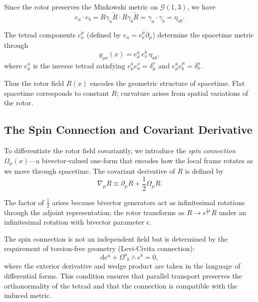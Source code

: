 \documentclass[11pt,a4paper]{article}
\numberwithin{equation}{section}
\theoremstyle{plain}
\theoremstyle{definition}
\theoremstyle{remark}
\newcommand{\dd}{\mathrm{d}}
\begin{document}
Since the rotor preserves the Minkowski metric on $\mathcal{G}(1,3)$, we have
\begin{equation}
e_a \cdot e_b = R\gamma_a\widetilde{R} \cdot R\gamma_b\widetilde{R} = \gamma_a \cdot \gamma_b = \eta_{ab}.
\end{equation}

The tetrad components $e_a^\mu$ (defined by $e_a = e_a^\mu \partial_\mu$) determine the spacetime metric through
\begin{equation}
g_{\mu\nu}(x) = e_\mu^a\, e_\nu^b\, \eta_{ab},
\label{eq:metric-def}
\end{equation}
where $e_\mu^a$ is the inverse tetrad satisfying $e_\mu^a e_a^\nu = \delta_\mu^\nu$ and $e_\mu^a e_b^\mu = \delta_b^a$.

Thus the rotor field $R(x)$ encodes the geometric structure of spacetime. Flat spacetime corresponds to constant $R$; curvature arises from spatial variations of the rotor.

\subsection{The Spin Connection and Covariant Derivative}

To differentiate the rotor field covariantly, we introduce the \emph{spin connection} $\Omega_\mu(x)$---a bivector-valued one-form that encodes how the local frame rotates as we move through spacetime. The covariant derivative of $R$ is defined by
\begin{equation}
\nabla_\mu R \equiv \partial_\mu R + \frac{1}{2}\Omega_\mu R.
\label{eq:covariant-def}
\end{equation}

The factor of $\frac{1}{2}$ arises because bivector generators act as infinitesimal rotations through the adjoint representation; the rotor transforms as $R \to e^{\frac{1}{2}\epsilon}R$ under an infinitesimal rotation with bivector parameter $\epsilon$.

The spin connection is not an independent field but is determined by the requirement of torsion-free geometry (Levi-Civita connection):
\begin{equation}
\dd e^a + \Omega^a_{\phantom{a}b} \wedge e^b = 0,
\label{eq:torsion-free}
\end{equation}
where the exterior derivative and wedge product are taken in the language of differential forms. This condition ensures that parallel transport preserves the orthonormality of the tetrad and that the connection is compatible with the induced metric.
\end{document}
